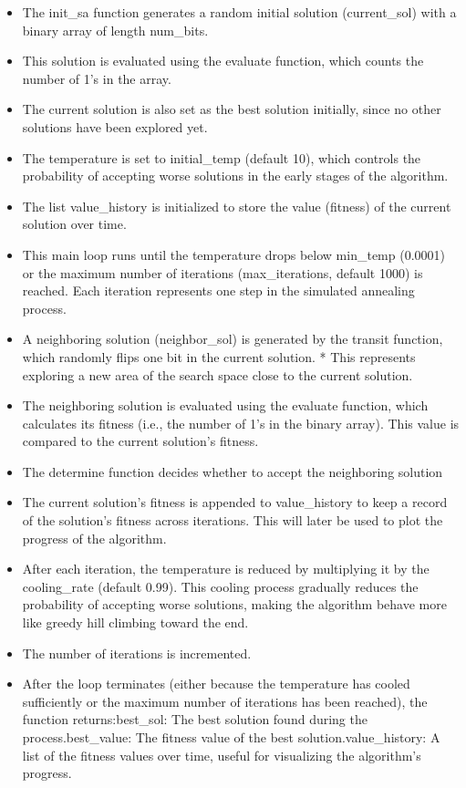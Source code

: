 \documentclass[
  letterpaper,
  DIV=11,
  numbers=noendperiod]{scrreprt}
\providecommand{\tightlist}{%
  \setlength{\itemsep}{0pt}\setlength{\parskip}{0pt}}\usepackage{longtable,booktabs,array}
\begin{document}
\begin{itemize}
\tightlist
\item
  The init\_sa function generates a random initial solution
  (current\_sol) with a binary array of length num\_bits.
\item
  This solution is evaluated using the evaluate function, which counts
  the number of 1's in the array.
\item
  The current solution is also set as the best solution initially, since
  no other solutions have been explored yet.
\item
  The temperature is set to initial\_temp (default 10), which controls
  the probability of accepting worse solutions in the early stages of
  the algorithm.
\item
  The list value\_history is initialized to store the value (fitness) of
  the current solution over time.
\item
  This main loop runs until the temperature drops below min\_temp
  (0.0001) or the maximum number of iterations (max\_iterations, default
  1000) is reached. Each iteration represents one step in the simulated
  annealing process.
\item
  A neighboring solution (neighbor\_sol) is generated by the transit
  function, which randomly flips one bit in the current solution. * This
  represents exploring a new area of the search space close to the
  current solution.
\item
  The neighboring solution is evaluated using the evaluate function,
  which calculates its fitness (i.e., the number of 1's in the binary
  array). This value is compared to the current solution's fitness.
\item
  The determine function decides whether to accept the neighboring
  solution
\item
  The current solution's fitness is appended to value\_history to keep a
  record of the solution's fitness across iterations. This will later be
  used to plot the progress of the algorithm.
\item
  After each iteration, the temperature is reduced by multiplying it by
  the cooling\_rate (default 0.99). This cooling process gradually
  reduces the probability of accepting worse solutions, making the
  algorithm behave more like greedy hill climbing toward the end.
\item
  The number of iterations is incremented.
\item
  After the loop terminates (either because the temperature has cooled
  sufficiently or the maximum number of iterations has been reached),
  the function returns:best\_sol: The best solution found during the
  process.best\_value: The fitness value of the best
  solution.value\_history: A list of the fitness values over time,
  useful for visualizing the algorithm's progress.
\end{itemize}
\end{document}
